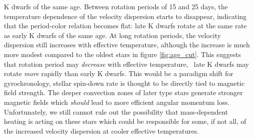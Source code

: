 K dwarfs of the same age.
Between rotation periods of 15 and 25 days, the temperature dependence of the
velocity dispersion starts to disappear, indicating that the period-color
relation becomes flat: late K dwarfs rotate at the same rate as early K dwarfs
of the same age.
At long rotation periods, the velocity dispersion still increases with
effective temperature, although the increase is much more modest compared to
the oldest stars in figure \ref{fig:age_cut}.
This suggests that rotation period may {\it decrease} with effective
temperature, \ie\ late K dwarfs may rotate {\it more} rapidly than early K
dwarfs.
This would be a paradigm shift for gyrochronology, stellar spin-down rate is
thought to be directly tied to magnetic field strength.
The deeper convection zones of later type stars generate stronger magnetic
fields which {\it should} lead to more efficient angular momentum loss.
Unfortunately, we still cannot rule out the possibility that mass-dependent
heating is acting on these stars which could be responsible for some, if not
all, of the increased velocity dispersion at cooler effective temperatures.

